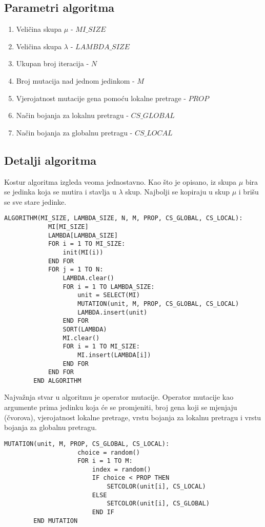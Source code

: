 \documentclass[times, utf8, diplomski, numeric]{fer}
\begin{document}
\subsection{Parametri algoritma}

\begin{enumerate}
	\item Veličina skupa $\mu$ - $MI\_SIZE$
	\item Veličina skupa $\lambda$ - $LAMBDA\_SIZE$
	\item Ukupan broj iteracija - $N$
	\item Broj mutacija nad jednom jedinkom - $M$
	\item Vjerojatnost mutacije gena pomoću lokalne pretrage - $PROP$
	\item Način bojanja za lokalnu pretragu - $CS\_GLOBAL$
	\item Način bojanja za globalnu pretragu - $CS\_LOCAL$
\end{enumerate}

\subsection{Detalji algoritma}

Kostur algoritma izgleda veoma jednostavno. Kao što je opisano, iz skupa $\mu$ bira se jedinka koja se mutira i stavlja u $\lambda$ skup. Najbolji se kopiraju u skup $\mu$ i brišu se sve stare jedinke. 

\begin{singlespace}
	\begin{lstlisting}[caption=Pseudok\^{o}d evolucijske strategije]
		ALGORITHM(MI_SIZE, LAMBDA_SIZE, N, M, PROP, CS_GLOBAL, CS_LOCAL):
			MI[MI_SIZE]
			LAMBDA[LAMBDA_SIZE]
			FOR i = 1 TO MI_SIZE:
				init(MI(i))
			END FOR
			FOR j = 1 TO N:
				LAMBDA.clear()
				FOR i = 1 TO LAMBDA_SIZE:
					unit = SELECT(MI)
					MUTATION(unit, M, PROP, CS_GLOBAL, CS_LOCAL)
					LAMBDA.insert(unit)
				END FOR
				SORT(LAMBDA)
				MI.clear()
				FOR i = 1 TO MI_SIZE:
					MI.insert(LAMBDA[i])
				END FOR
			END FOR
		END ALGORITHM
	\end{lstlisting}
\end{singlespace}

Najvažnja stvar u algoritmu je operator mutacije. Operator mutacije kao argumente prima jedinku koja će se promjeniti, broj gena koji se mjenjaju (čvorova), vjerojatnost lokalne pretrage, vrstu bojanja za lokalnu pretragu i vrstu bojanja za globalnu pretragu. 

\begin{singlespace}
	\begin{lstlisting}[caption=Pseudok\^{o}d mutacije evolucijske strategije]
		MUTATION(unit, M, PROP, CS_GLOBAL, CS_LOCAL):
					choice = random()
					FOR i = 1 TO M:
						index = random()
						IF choice < PROP THEN
							SETCOLOR(unit[i], CS_LOCAL)
						ELSE
							SETCOLOR(unit[i], CS_GLOBAL)
						END IF
		END MUTATION
	\end{lstlisting}
\end{singlespace}
\end{document}
